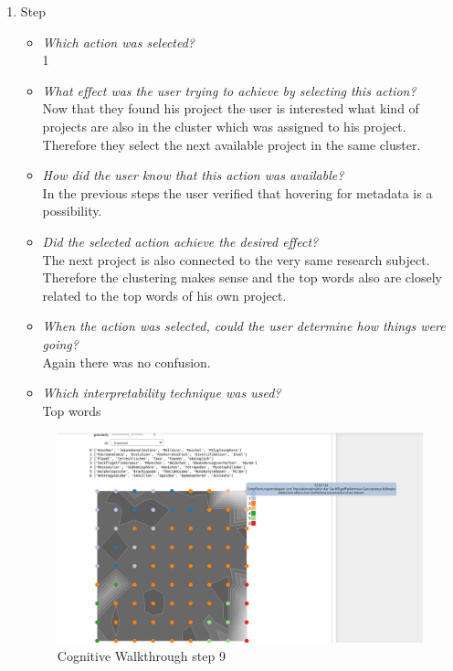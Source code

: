 {\begin{enumerate}
		\item Step
		\begin{itemize}
			\item \textit{Which action was selected?} \\
			1
			\item \textit{What effect was the user trying to achieve by selecting this action?} \\
			Now that they found his project the user is interested what kind of projects are also in the cluster which was assigned to his project. Therefore they select the next available project in the same cluster. 
			\item \textit{How did the user know that this action was available?} \\
			In the previous steps the user verified that hovering for metadata is a possibility. 
			\item \textit{Did the selected action achieve the desired effect?} \\
			The next project is also connected to the very same research subject. Therefore the clustering makes sense and the top words also are closely related to the top words of his own project. 
			\item \textit{When the action was selected, could the user determine how things were going?} \\
			Again there was no confusion.
			\item \textit{Which interpretability technique was used?}\\
			Top words
		\end{itemize}
		\begin{figure}[H]
			\centering
			\includegraphics[width=400px]{../chapters/validation/pics/7_c}
			\caption{\label{pic:step9} Cognitive Walkthrough step 9}
		\end{figure} \newpage
		

\end{enumerate}}

